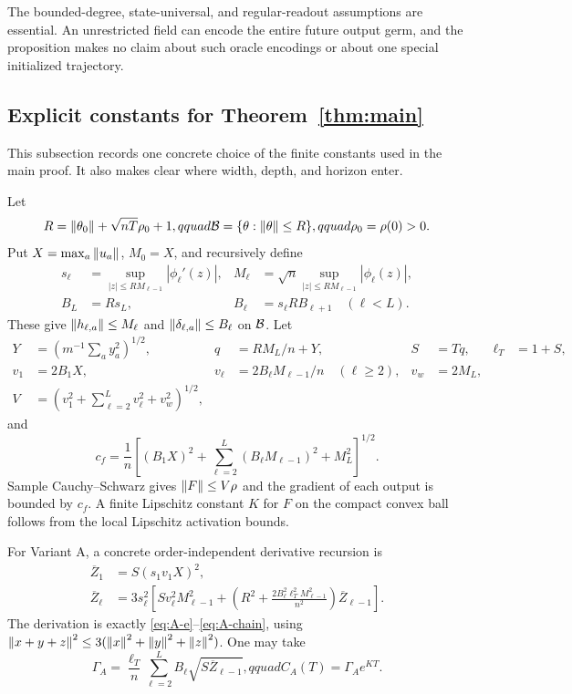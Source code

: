 The bounded-degree, state-universal, and regular-readout assumptions are
essential.  An unrestricted field can encode the entire future output germ,
and the proposition makes no claim about such oracle encodings or about one
special initialized trajectory.

\subsection{Explicit constants for Theorem~\ref{thm:main}}
\label{app:constants}

This subsection records one concrete choice of the finite constants used in
the main proof.  It also makes clear where width, depth, and horizon enter.

Let
\begin{equation}
 R=\left\lVert \theta_0\right\rVert+\sqrt{nT}\rho_0+1,qquad
 \mathcal B=\{\theta:\left\lVert \theta\right\rVert\le R\},qquad \rho_0=\rho(0)>0.
\end{equation}
Put $X=\max_a\left\lVert u_a\right\rVert$, $M_0=X$, and recursively define
\begin{align}
s_\ell&=\sup_{|z|\le RM_{\ell-1}}|\phi_\ell'(z)|,
&M_\ell&=\sqrt n\sup_{|z|\le RM_{\ell-1}}|\phi_\ell(z)|,\nonumber\\
B_L&=Rs_L,
&B_\ell&=s_\ell R B_{\ell+1}\quad(\ell<L).
\label{eq:explicit-response-bounds}
\end{align}
These give $\left\lVert h_{\ell,a}\right\rVert\le M_\ell$ and
$\left\lVert \delta_{\ell,a}\right\rVert\le B_\ell$ on $\mathcal B$.  Let
\begin{align}
Y&=\left(m^{-1}\sum_a y_a^2\right)^{1/2},&
q&=RM_L/n+Y,&S&=Tq,&\ell_T&=1+S,\nonumber\\
v_1&=2B_1X,&
v_\ell&=2B_\ell M_{\ell-1}/n\quad(\ell\ge2),&
v_w&=2M_L,\nonumber\\
V&=\left(v_1^2+\sum_{\ell=2}^Lv_\ell^2+v_w^2\right)^{1/2},
\label{eq:explicit-V}
\end{align}
and
\begin{equation}
 c_f=\frac1n\left[(B_1X)^2+
 \sum_{\ell=2}^L(B_\ell M_{\ell-1})^2+M_L^2\right]^{1/2}.
 \label{eq:explicit-cf}
\end{equation}
Sample Cauchy--Schwarz gives $\left\lVert F\right\rVert\le V\rho$ and the gradient of
each output is bounded by $c_f$.  A finite Lipschitz constant $K$ for $F$ on
the compact convex ball follows from the local Lipschitz activation bounds.

For Variant A, a concrete order-independent derivative recursion is
\begin{align}
\overline Z_1&=S(s_1v_1X)^2,\nonumber\\
\overline Z_\ell&=3s_\ell^2\left[
 S v_\ell^2M_{\ell-1}^2+
 \left(R^2+\frac{2B_\ell^2\ell_T^2M_{\ell-1}^2}{n^2}\right)
 \overline Z_{\ell-1}\right].
\label{eq:explicit-Z}
\end{align}
The derivation is exactly \eqref{eq:A-e}--\eqref{eq:A-chain}, using
$\left\lVert x+y+z\right\rVert^2\le3(\left\lVert x\right\rVert^2+\left\lVert y\right\rVert^2+\left\lVert z\right\rVert^2)$.  One may take
\begin{equation}
 \Gamma_A=\frac{\ell_T}{n}\sum_{\ell=2}^L
 B_\ell\sqrt{S\overline Z_{\ell-1}},qquad
 C_A(T)=\Gamma_Ae^{KT}.
 \label{eq:explicit-GammaA}
\end{equation}

